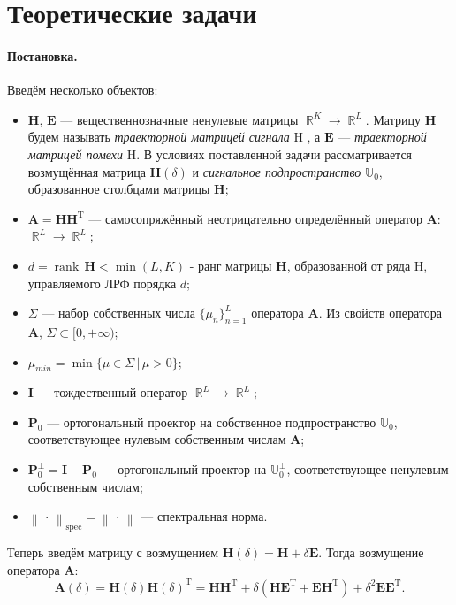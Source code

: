 \documentclass[specialist,
               substylefile = spbu_report.rtx,
               subf,href,colorlinks=true, 12pt]{disser}
\newcommand\norm[1]{\left\|#1\right\|}
\DeclareMathOperator\R{\mathbb{R}}
\DeclareMathOperator\rank{\textrm{rank}\,}
\newenvironment{statement}{\paragraph{Постановка.}}{\hfill}
\begin{document}
\section{Теоретические задачи}
\begin{statement}
Введём несколько объектов:
\begin{itemize}
	\item $\mathbf{H}$, $\mathbf{E}$ --- вещественнозначные ненулевые матрицы $\R^K \rightarrow \R^L$. Матрицу $\mathbf{H}$ будем называть \emph{траекторной матрицей сигнала} $\mathrm{H}$ , а $\mathbf{E}$ --- \emph{траекторной матрицей помехи} $\mathrm{H}$. В условиях поставленной задачи рассматривается возмущённая матрица $\mathbf{H}(\delta)$ и \emph{сигнальное подпространство} $\mathbb{U}_0$, образованное столбцами матрицы $\mathbf{H}$;
	\item  $\mathbf{A} = \mathbf{HH}^\mathrm{T}$ --- самосопряжённый неотрицательно определённый оператор $\mathbf{A}$: $\R^L \rightarrow \R^L$;
	\item $d = \rank\mathbf{H} < \min(L, K)$ - ранг матрицы $\mathbf{H}$, образованной от ряда $\mathrm{H}$, управляемого ЛРФ порядка $d$;
	\item $\Sigma$ --- набор собственных числа $\{\mu_n\}_{n=1}^L$ оператора $\mathbf{A}$. Из свойств оператора $\mathbf{A}$, $\Sigma \subset [0, +\infty)$;
	\item $\mu_{min} = \min\{\mu\in\Sigma\, |\, \mu > 0\}$;
	\item $\mathbf{I}$ --- тождественный оператор $\R^L \rightarrow \R^L$;
	\item $\mathbf{P}_0$ --- ортогональный проектор на собственное подпространство $\mathbb{U}_0$, соответствующее нулевым собственным числам $\mathbf{A}$;
	\item $\mathbf{P}^\bot_0 = \mathbf{I} - \mathbf{P}_0$ --- ортогональный проектор на $\mathbb{U}_0^\bot$, соответствующее ненулевым собственным числам;
	\item $\norm{\,\cdot\,}_{\mathrm{spec}}=\norm{\,\cdot\,}$ --- спектральная норма.
\end{itemize}
Теперь введём матрицу с возмущением $\mathbf{H}(\delta) = \mathbf{H} + \delta\mathbf{E}$. Тогда возмущение оператора $\mathbf{A}$:
\begin{equation*}
	\mathbf{A}(\delta) = \mathbf{H}(\delta)\mathbf{H}(\delta)^\mathrm{T} = \mathbf{H}\mathbf{H}^\mathrm{T} + \delta(\mathbf{H}\mathbf{E}^\mathrm{T} + \mathbf{E}\mathbf{H}^\mathrm{T}) + \delta^2\mathbf{E}\mathbf{E}^\mathrm{T}.
\end{equation*}

\end{statement}
\end{document}
